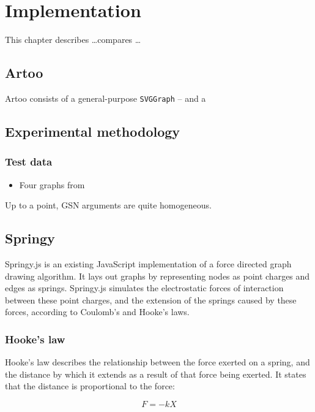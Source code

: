 \chapter{Implementation}

This chapter describes \ldots compares \ldots




\section{Artoo}

Artoo consists of a general-purpose {\tt SVGGraph}  -- and a


\section{Experimental methodology}


\subsection{Test data}

\begin{itemize}
    \item Four graphs from \citet{aldenthesis}
\end{itemize}

Up to a point, GSN arguments are quite homogeneous. 


\section{Springy}

Springy.js is an existing JavaScript implementation of a force directed graph drawing algorithm.
It lays out graphs by representing nodes as point charges and edges as springs. Springy.js simulates the electrostatic forces of interaction between these point charges, and the extension of the springs caused by these forces, according to Coulomb's and Hooke's laws.

\subsection{Hooke's law}

Hooke's law describes the relationship between the force exerted on a spring, and the distance by which it extends as a result of that force being exerted.
It states that the distance is proportional to the force:

$$
F = -kX
$$

